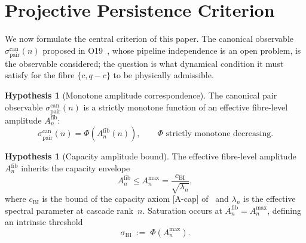 \documentclass[11pt,a4paper]{article}
\theoremstyle{definition}
\newtheorem{hypothesis}[theorem]{Hypothesis}
\theoremstyle{remark}
\begin{document}
  \section{Projective Persistence Criterion}
    \label{sec:persistence-criterion}

    We now formulate the central criterion of this paper.
    The canonical observable $\sigma_{\mathrm{pair}}^{\mathrm{can}}(n)$
    proposed in O19~\cite{Beau2026a23}, whose pipeline independence is an open
    problem, is the observable considered; the question is what dynamical condition it must satisfy
    for the fibre $\{c, q-c\}$ to be physically admissible.

    \begin{hypothesis}[Monotone amplitude correspondence]
      \label{hyp:H1}
      The canonical pair observable
      $\sigma_{\mathrm{pair}}^{\mathrm{can}}(n)$ is a strictly monotone
      function of an effective fibre-level amplitude
      $A_n^{\mathrm{fib}}$:
      \[
        \sigma_{\mathrm{pair}}^{\mathrm{can}}(n)
        = \Phi\!\left(A_n^{\mathrm{fib}}(n)\right),
        \qquad \Phi \text{ strictly monotone decreasing.}
      \]
    \end{hypothesis}

    \begin{hypothesis}[Capacity amplitude bound]
      \label{hyp:H2}
      The effective fibre-level amplitude $A_n^{\mathrm{fib}}$ inherits
      the capacity envelope
      \[
        A_n^{\mathrm{fib}} \leq A_n^{\max}
        = \frac{c_{\mathrm{BI}}}{\sqrt{\lambda_n}},
      \]
      where $c_{\mathrm{BI}}$ is the bound of the capacity axiom
      [A-cap] of~\cite{Beau2026c} and
      $\lambda_n$ is the effective spectral parameter at cascade rank~$n$.
      Saturation occurs at $A_n^{\mathrm{fib}} = A_n^{\max}$, defining
      an intrinsic threshold
      \[
        \sigma_{\mathrm{BI}}
        \;:=\; \Phi\!\left(A_n^{\max}\right).
      \]
    \end{hypothesis}
\end{document}
